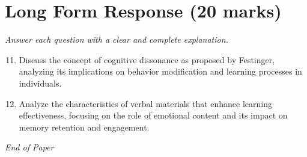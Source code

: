 \documentclass[12pt]{article}
\begin{document}
\section*{Long Form Response (20 marks)}
\textit{Answer each question with a clear and complete explanation.}
\begin{enumerate}[label=\arabic*.]
\setcounter{enumi}{10}
\item Discuss the concept of cognitive dissonance as proposed by Festinger, analyzing its implications on behavior modification and learning processes in individuals.
\item Analyze the characteristics of verbal materials that enhance learning effectiveness, focusing on the role of emotional content and its impact on memory retention and engagement.
\end{enumerate}

\vfill
\noindent\textit{End of Paper}
\end{document}
